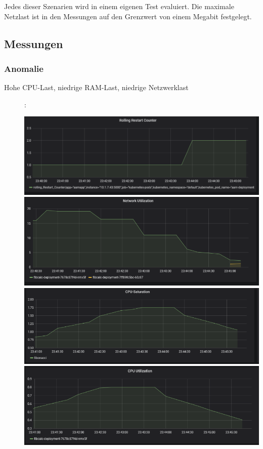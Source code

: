 \documentclass[a4paper,10pt]{scrartcl}
\begin{document}
Jedes dieser Szenarien wird in einem eigenen Test evaluiert.
Die maximale Netzlast ist in den Messungen auf den Grenzwert von einem Megabit festgelegt.

\pagebreak
\subsection{Messungen}

\subsubsection{Anomalie}

\begin{description}
\item[Hohe CPU-Last, niedrige RAM-Last, niedrige Netzwerklast]:\\

\begin{minipage}{\linewidth}
            \includegraphics[width=.8\textwidth]{img/CPUAnomalie/RollingRestart.PNG}
            \includegraphics[width=.5\textwidth]{img/CPUAnomalie/Netzwerk.PNG}
            \includegraphics[scale=1,width=.8\textwidth,height=.14\textheight]{img/CPUAnomalie/Saturation.PNG}
  			\includegraphics[scale=1,width=.8\textwidth]{img/CPUAnomalie/Utilization.PNG}
\end{minipage}


\end{description}
\end{document}

